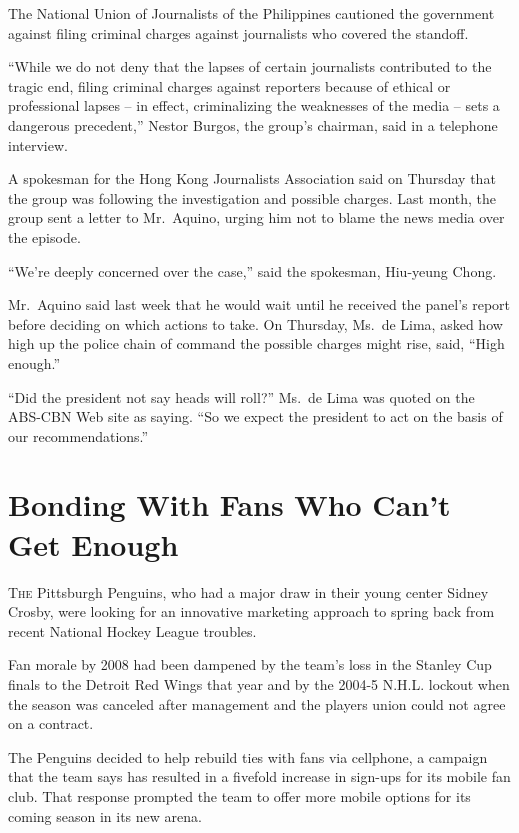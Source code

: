 ﻿\documentclass[12pt]{article}
\begin{document}
The National Union of Journalists of the Philippines cautioned the government against filing
criminal charges against journalists who covered the standoff.

``While we do not deny that the lapses of certain journalists contributed to the tragic end, filing
criminal charges against reporters because of ethical or professional lapses -- in effect,
criminalizing the weaknesses of the media -- sets a dangerous precedent,'' Nestor Burgos, the
group's chairman, said in a telephone interview.

A spokesman for the Hong Kong Journalists Association said on Thursday that the group was following
the investigation and possible charges. Last month, the group sent a letter to Mr.~Aquino, urging
him not to blame the news media over the episode.

``We're deeply concerned over the case,'' said the spokesman, Hiu-yeung Chong.

Mr.~Aquino said last week that he would wait until he received the panel's report before deciding on
which actions to take. On Thursday, Ms.~de Lima, asked how high up the police chain of command the
possible charges might rise, said, ``High enough.''

``Did the president not say heads will roll?'' Ms.~de Lima was quoted on the ABS-CBN Web site as
saying. ``So we expect the president to act on the basis of our recommendations.''


\pagebreak
\section{Bonding With Fans Who Can't Get Enough}

\lettrine{T}{he} Pittsburgh Penguins, who had a major draw in their young
center Sidney Crosby, were looking for an innovative marketing approach to spring back from recent
National Hockey League troubles.

Fan morale by 2008 had been dampened by the team's loss in the Stanley Cup finals to the Detroit Red
Wings that year and by the 2004-5 N.H.L. lockout when the season was canceled after management and
the players union could not agree on a contract.

The Penguins decided to help rebuild ties with fans via cellphone, a campaign that the team says has
resulted in a fivefold increase in sign-ups for its mobile fan club. That response prompted the team
to offer more mobile options for its coming season in its new arena.
\end{document}
